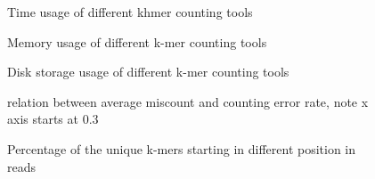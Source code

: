 \documentclass{article}
\begin{document}

\begin{figure}
\caption{Time usage of different khmer counting tools}
\label{cmp_time}
\end{figure}

\begin{figure}
\caption{Memory usage of different k-mer counting tools}
\label{cmp_memory}
\end{figure}

\begin{figure}
\caption{Disk storage usage of different k-mer counting tools}
\label{cmp_disk}
\end{figure}

\begin{figure}
\caption{relation between average miscount and counting error rate, note x axis starts at 0.3}
\label{average_offset_vs_fpr}
\end{figure}

\begin{figure}
\caption{Percentage of the unique k-mers starting in different position in 
reads}
\label{perc_unique_pos}
\end{figure}
\end{document}
